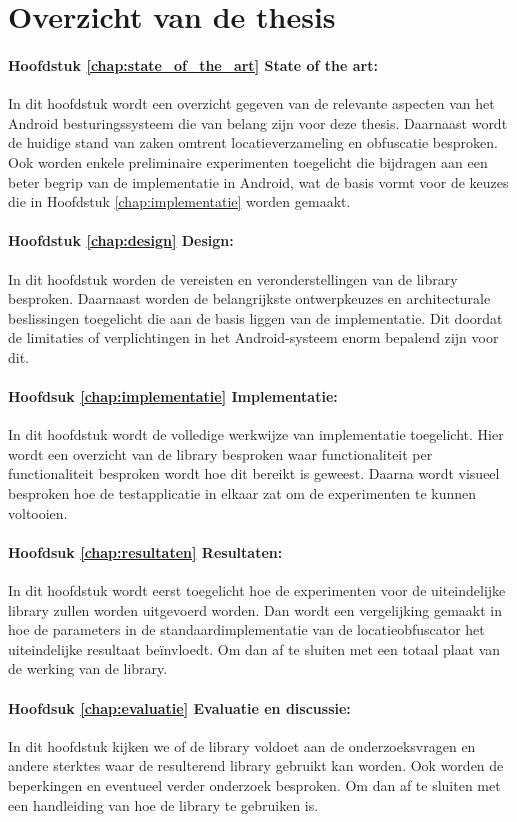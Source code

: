 \section{Overzicht van de thesis}
\paragraph{Hoofdstuk \ref{chap:state_of_the_art} State of the art:} In dit hoofdstuk wordt een overzicht gegeven van de relevante aspecten van het Android besturingssysteem die van belang zijn voor deze thesis. Daarnaast wordt de huidige stand van zaken omtrent locatieverzameling en obfuscatie besproken. Ook worden enkele preliminaire experimenten toegelicht die bijdragen aan een beter begrip van de implementatie in Android, wat de basis vormt voor de keuzes die in Hoofdstuk \ref{chap:implementatie} worden gemaakt.
\paragraph{Hoofdstuk \ref{chap:design} Design:} In dit hoofdstuk worden de vereisten en veronderstellingen van de library besproken. Daarnaast worden de belangrijkste ontwerpkeuzes en architecturale beslissingen toegelicht die aan de basis liggen van de implementatie. Dit doordat de limitaties of verplichtingen in het Android-systeem enorm bepalend zijn voor dit.
\paragraph{Hoofdsuk \ref{chap:implementatie} Implementatie:} In dit hoofdstuk wordt de volledige werkwijze van implementatie toegelicht. Hier wordt een overzicht van de library besproken waar functionaliteit per functionaliteit besproken wordt hoe dit bereikt is geweest. Daarna wordt visueel besproken hoe de testapplicatie in elkaar zat om de experimenten te kunnen voltooien.
\paragraph{Hoofdsuk \ref{chap:resultaten} Resultaten:} In dit hoofdstuk wordt eerst toegelicht hoe de experimenten voor de uiteindelijke library zullen worden uitgevoerd worden. Dan wordt een vergelijking gemaakt in hoe de parameters in de standaardimplementatie van de locatieobfuscator het uiteindelijke resultaat beïnvloedt. Om dan af te sluiten met een totaal plaat van de werking van de library.
\paragraph{Hoofdsuk \ref{chap:evaluatie} Evaluatie en discussie:} In dit hoofdstuk kijken we of de library voldoet aan de onderzoeksvragen en andere sterktes waar de resulterend library gebruikt kan worden. Ook worden de beperkingen en eventueel verder onderzoek besproken. Om dan af te sluiten met een handleiding van hoe de library te gebruiken is.


